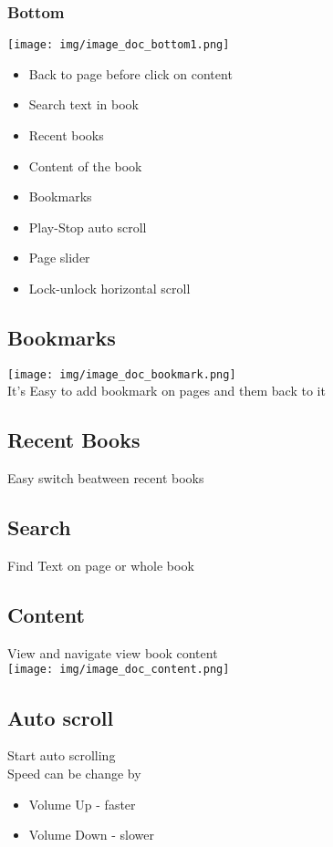 \documentclass[14pt,letter]{article}
\begin{document}
\subsubsection{Bottom}
\texttt{[image: img/image\_doc\_bottom1.png]}
\begin{itemize}
  \item Back to page before click on content
  \item Search text in book
  \item Recent books
  \item Content of the book
  \item Bookmarks
  \item Play-Stop auto scroll
  \item Page slider
  \item Lock-unlock horizontal scroll
\end{itemize}

\subsection{Bookmarks}
\texttt{[image: img/image\_doc\_bookmark.png]}\\
It's Easy to add bookmark on pages and them back to it
\subsection{Recent Books}
Easy switch beatween recent books
\subsection{Search}
Find Text on page or whole book
\subsection{Content}
View and navigate view book content\\
\texttt{[image: img/image\_doc\_content.png]}\\

\subsection{Auto scroll}
Start auto scrolling\\
Speed can be change by 
\begin{itemize}
  \item Volume Up - faster
  \item Volume Down - slower
\end{itemize}
\end{document}
